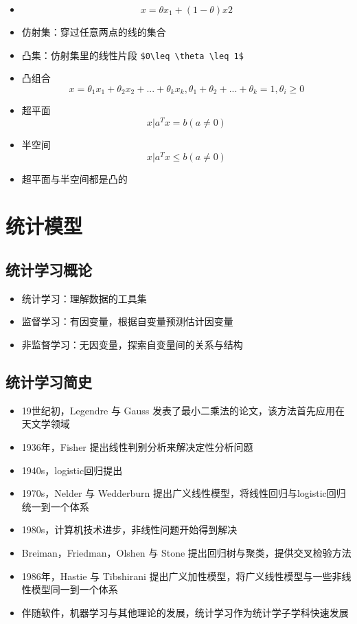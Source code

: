 \documentclass[
]{book}
\providecommand{\tightlist}{%
  \setlength{\itemsep}{0pt}\setlength{\parskip}{0pt}}
\begin{document}
\begin{itemize}
\tightlist
\item
  \[x = \theta x_1 + (1-\theta)x2\]
\item
  仿射集：穿过任意两点的线的集合
\item
  凸集：仿射集里的线性片段 \texttt{\$0\textbackslash{}leq\ \textbackslash{}theta\ \textbackslash{}leq\ 1\$}
\item
  凸组合 \[x = \theta_1 x_1 + \theta_2 x_2+...+\theta_kx_k, \theta_1+\theta_2+...+\theta_k = 1, \theta_i\geq0\]
\item
  超平面 \[{x|a^Tx = b}(a\neq 0)\]
\item
  半空间\[{x|a^Tx \leq b}(a\neq 0)\]
\item
  超平面与半空间都是凸的
\end{itemize}

\hypertarget{mlsl}{%
\chapter{统计模型}\label{mlsl}}

\hypertarget{ux7edfux8ba1ux5b66ux4e60ux6982ux8bba}{%
\section{统计学习概论}\label{ux7edfux8ba1ux5b66ux4e60ux6982ux8bba}}

\begin{itemize}
\tightlist
\item
  统计学习：理解数据的工具集
\item
  监督学习：有因变量，根据自变量预测估计因变量
\item
  非监督学习：无因变量，探索自变量间的关系与结构
\end{itemize}

\hypertarget{ux7edfux8ba1ux5b66ux4e60ux7b80ux53f2}{%
\section{统计学习简史}\label{ux7edfux8ba1ux5b66ux4e60ux7b80ux53f2}}

\begin{itemize}
\tightlist
\item
  19世纪初，Legendre 与 Gauss 发表了最小二乘法的论文，该方法首先应用在天文学领域
\item
  1936年，Fisher 提出线性判别分析来解决定性分析问题
\item
  1940s，logistic回归提出
\item
  1970s，Nelder 与 Wedderburn 提出广义线性模型，将线性回归与logistic回归统一到一个体系
\item
  1980s，计算机技术进步，非线性问题开始得到解决
\item
  Breiman，Friedman，Olshen 与 Stone 提出回归树与聚类，提供交叉检验方法
\item
  1986年，Hastie 与 Tibshirani 提出广义加性模型，将广义线性模型与一些非线性模型同一到一个体系
\item
  伴随软件，机器学习与其他理论的发展，统计学习作为统计学子学科快速发展
\end{itemize}
\end{document}
